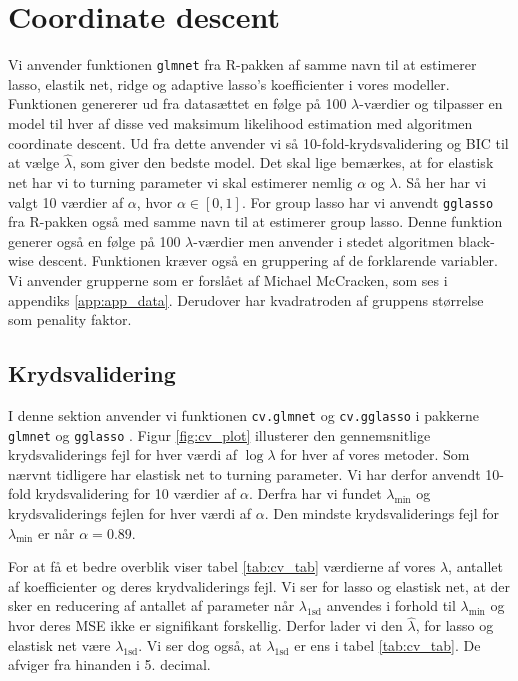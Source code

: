 \section{Coordinate descent}
Vi anvender funktionen \texttt{glmnet} fra R-pakken af samme navn til at estimerer lasso, elastik net, ridge og adaptive lasso's koefficienter i vores modeller. Funktionen genererer ud fra datasættet en følge på 100 $\lambda$-værdier og tilpasser en model til hver af disse ved maksimum likelihood estimation med algoritmen coordinate descent. 
Ud fra dette anvender vi så 10-fold-krydsvalidering og BIC til at vælge $\widehat{\lambda}$, som giver den bedste model. 
Det skal lige bemærkes, at for elastisk net har vi to turning parameter vi skal estimerer nemlig $\alpha$ og $\lambda$.  Så her har vi valgt 10 værdier af  $\alpha$, hvor $\alpha \in [0,1]$. 
For group lasso har vi anvendt \texttt{gglasso} fra R-pakken også med samme navn til at estimerer group lasso. Denne funktion generer også en følge på 100 $\lambda$-værdier men anvender i stedet algoritmen black-wise descent.  Funktionen kræver også en gruppering af de forklarende variabler. 
Vi anvender grupperne som er forslået af Michael McCracken, som ses i appendiks \ref{app:app_data}. Derudover har kvadratroden af gruppens størrelse som penality faktor. 

\subsection{Krydsvalidering}
I denne sektion anvender vi funktionen \texttt{cv.glmnet} og \texttt{cv.gglasso} i pakkerne \texttt{glmnet} og \texttt{gglasso} . 
Figur \ref{fig:cv_plot} illusterer den gennemsnitlige krydsvaliderings fejl for hver værdi af $\log \lambda$ for hver af vores metoder.
Som nærvnt tidligere har elastisk net to turning parameter. Vi har derfor anvendt 10-fold krydsvalidering for 10 værdier af $\alpha$. Derfra har vi fundet  $\lambda_{\min}$ og krydsvaliderings fejlen for hver værdi af $\alpha$.  
Den mindste krydsvaliderings fejl for $\lambda_{\min}$ er når $\alpha =0.89$. 




For at få et bedre overblik viser tabel  \ref{tab:cv_tab} værdierne af vores $\lambda$, antallet af koefficienter og deres krydvaliderings fejl. 
Vi ser for lasso og elastisk net, at der sker en reducering af antallet af parameter når $\lambda_{1\text{sd}}$ anvendes i forhold til $\lambda_{\min}$ og hvor deres MSE ikke er signifikant forskellig.  
Derfor lader vi den $\widehat{\lambda}$, for lasso og elastisk net være $\lambda_{1\text{sd}}$.
Vi ser dog også, at $\lambda_{1\text{sd}}$ er ens i tabel \ref{tab:cv_tab}. 
De afviger fra hinanden i 5. decimal.  

